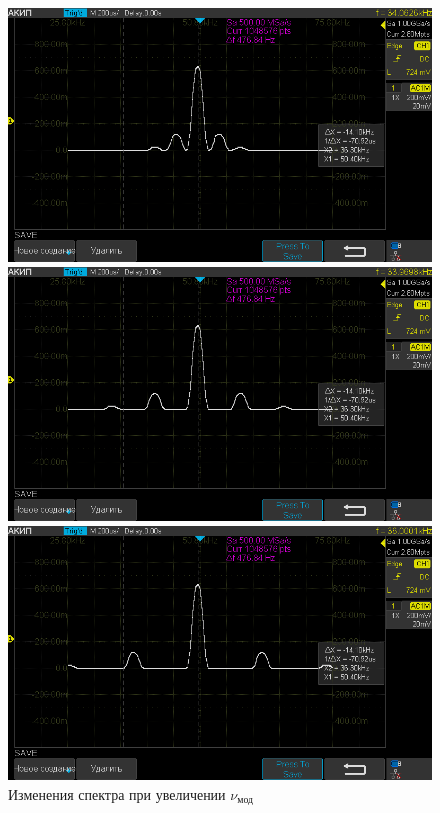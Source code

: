 \begin{figure}[H]
	\centering
	\begin{minipage}[b]{.33\textwidth}
		\centering
		\includegraphics[width=0.9\linewidth]{"../photos/am1"}
	\end{minipage}%
	\begin{minipage}[b]{.33\textwidth}
		\centering
		\includegraphics[width=0.9\linewidth]{"../photos/am2"}
	\end{minipage}%
	\begin{minipage}[b]{.33\textwidth}
		\centering
		\includegraphics[width=0.9\linewidth]{"../photos/am3"}
	\end{minipage}
	\caption{Изменения спектра при увеличении $\nu_{\text{мод}}$}
	\label{photo:am}
\end{figure}

